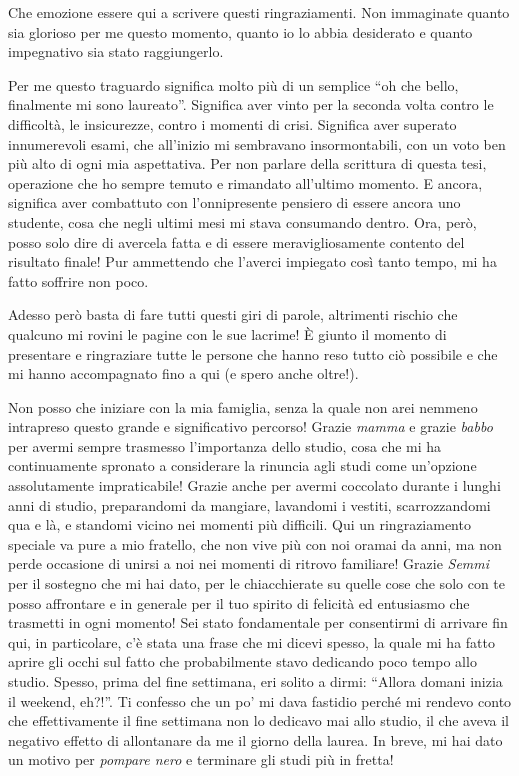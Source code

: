\begin{acknowledgements}
  Che emozione essere qui a scrivere questi ringraziamenti.
  Non immaginate quanto sia glorioso per me questo momento, quanto io lo abbia desiderato e quanto impegnativo sia stato raggiungerlo.

  Per me questo traguardo significa molto più di un semplice ``oh che bello, finalmente mi sono laureato''.
  Significa aver vinto per la seconda volta contro le difficoltà, le insicurezze, contro i momenti di crisi.
  Significa aver superato innumerevoli esami, che all'inizio mi sembravano insormontabili, con un voto ben più alto di ogni mia aspettativa.
  Per non parlare della scrittura di questa tesi, operazione che ho sempre temuto e rimandato all'ultimo momento.
  E ancora, significa aver combattuto con l'onnipresente pensiero di essere ancora uno studente, cosa che negli ultimi mesi mi stava consumando dentro.
  Ora, però, posso solo dire di avercela fatta e di essere meravigliosamente contento del risultato finale!
  Pur ammettendo che l'averci impiegato così tanto tempo, mi ha fatto soffrire non poco.

  Adesso però basta di fare tutti questi giri di parole, altrimenti rischio che qualcuno mi rovini le pagine con le sue lacrime!
  È giunto il momento di presentare e ringraziare tutte le persone che hanno reso tutto ciò possibile e che mi hanno accompagnato fino a qui (e spero anche oltre!).

  Non posso che iniziare con la mia famiglia, senza la quale non arei nemmeno intrapreso questo grande  e significativo percorso! Grazie \emph{mamma} e grazie \emph{babbo} per avermi sempre trasmesso l'importanza dello studio, cosa che mi ha continuamente spronato a considerare la rinuncia agli studi come un'opzione assolutamente impraticabile! Grazie anche per avermi coccolato durante i lunghi anni di studio, preparandomi da mangiare, lavandomi i vestiti, scarrozzandomi qua e là, e standomi vicino nei momenti più difficili. Qui un ringraziamento speciale va pure a mio fratello, che non vive più con noi oramai da anni, ma non perde occasione di unirsi a noi nei momenti di ritrovo familiare! Grazie \emph{Semmi} per il sostegno che mi hai dato, per le chiacchierate su quelle cose che solo con te posso affrontare e in generale per il tuo spirito di felicità ed entusiasmo che trasmetti in ogni momento! Sei stato fondamentale per consentirmi di arrivare fin qui, in particolare, c'è stata una frase che mi dicevi spesso, la quale mi ha fatto aprire gli occhi sul fatto che probabilmente stavo dedicando poco tempo allo studio. Spesso, prima del fine settimana, eri solito a dirmi: ``Allora domani inizia il weekend, eh?!''. Ti confesso che un po' mi dava fastidio perché mi rendevo conto che effettivamente il fine settimana non lo dedicavo mai allo studio, il che aveva il negativo effetto di allontanare da me il giorno della laurea. In breve, mi hai dato un motivo per \emph{pompare nero} e terminare gli studi più in fretta!


\end{acknowledgements}
